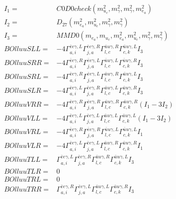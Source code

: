 \documentclass[A4,landscape]{article}
\begin{document}
\begin{align} 
I_1 = & C0D0check(m^2_{u_{{c}}}, m^2_{\gamma}, m^2_{\gamma}, m^2_{e_{{a}}}) \\ 
I_2 = & D_{27}(m^2_{e_{{a}}}, m^2_{u_{{c}}}, m^2_{\gamma}, m^2_{\gamma}) \\ 
I_3 = & MMD0(m_{e_{{a}}}, m_{u_{{c}}}, m^2_{e_{{a}}}, m^2_{u_{{c}}}, m^2_{\gamma}, m^2_{\gamma}) \\ 
  BOlluuSLL= & -4  \Gamma^{\bar{e}e \gamma ,L}_{a, i} \Gamma^{\bar{e}e \gamma ,R}_{j, a} \Gamma^{\bar{u}u \gamma ,R}_{l, c} \Gamma^{\bar{u}u \gamma ,L}_{c, k} I_3 \\ 
  BOlluuSRR= & -4  \Gamma^{\bar{e}e \gamma ,R}_{a, i} \Gamma^{\bar{e}e \gamma ,L}_{j, a} \Gamma^{\bar{u}u \gamma ,L}_{l, c} \Gamma^{\bar{u}u \gamma ,R}_{c, k} I_3 \\ 
  BOlluuSRL= & -4  \Gamma^{\bar{e}e \gamma ,R}_{a, i} \Gamma^{\bar{e}e \gamma ,L}_{j, a} \Gamma^{\bar{u}u \gamma ,R}_{l, c} \Gamma^{\bar{u}u \gamma ,L}_{c, k} I_3 \\ 
  BOlluuSLR= & -4  \Gamma^{\bar{e}e \gamma ,L}_{a, i} \Gamma^{\bar{e}e \gamma ,R}_{j, a} \Gamma^{\bar{u}u \gamma ,L}_{l, c} \Gamma^{\bar{u}u \gamma ,R}_{c, k} I_3 \\ 
  BOlluuVRR= & -4  \Gamma^{\bar{e}e \gamma ,R}_{a, i} \Gamma^{\bar{e}e \gamma ,R}_{j, a} \Gamma^{\bar{u}u \gamma ,R}_{l, c} \Gamma^{\bar{u}u \gamma ,R}_{c, k} (I_1 - 3 I_2) \\ 
  BOlluuVLL= & -4  \Gamma^{\bar{e}e \gamma ,L}_{a, i} \Gamma^{\bar{e}e \gamma ,L}_{j, a} \Gamma^{\bar{u}u \gamma ,L}_{l, c} \Gamma^{\bar{u}u \gamma ,L}_{c, k} (I_1 - 3 I_2) \\ 
  BOlluuVRL= & -4  \Gamma^{\bar{e}e \gamma ,R}_{a, i} \Gamma^{\bar{e}e \gamma ,R}_{j, a} \Gamma^{\bar{u}u \gamma ,L}_{l, c} \Gamma^{\bar{u}u \gamma ,L}_{c, k} I_1 \\ 
  BOlluuVLR= & -4  \Gamma^{\bar{e}e \gamma ,L}_{a, i} \Gamma^{\bar{e}e \gamma ,L}_{j, a} \Gamma^{\bar{u}u \gamma ,R}_{l, c} \Gamma^{\bar{u}u \gamma ,R}_{c, k} I_1 \\ 
  BOlluuTLL= &  \Gamma^{\bar{e}e \gamma ,L}_{a, i} \Gamma^{\bar{e}e \gamma ,R}_{j, a} \Gamma^{\bar{u}u \gamma ,R}_{l, c} \Gamma^{\bar{u}u \gamma ,L}_{c, k} I_3 \\ 
  BOlluuTLR= & 0 \\ 
  BOlluuTRL= & 0 \\ 
  BOlluuTRR= &  \Gamma^{\bar{e}e \gamma ,R}_{a, i} \Gamma^{\bar{e}e \gamma ,L}_{j, a} \Gamma^{\bar{u}u \gamma ,L}_{l, c} \Gamma^{\bar{u}u \gamma ,R}_{c, k} I_3 \\ 
\end{align} 
\end{document}
